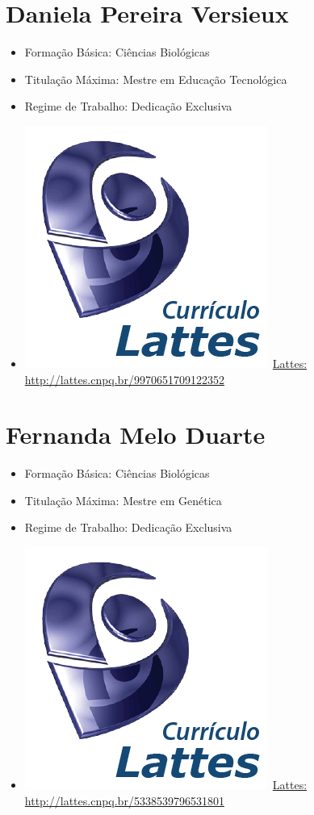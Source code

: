 \documentclass[11pt,fleqn]{book} %
\begin{document}
\section{Daniela Pereira Versieux}\label{DanielaVersieux}
\begin{itemize}
	\item Formação Básica: Ciências Biológicas
	\item Titulação Máxima: Mestre em Educação Tecnológica
	\item Regime de Trabalho: Dedicação Exclusiva
	\item \includegraphics[scale=.03]{Pictures/lattes}~\href{http://lattes.cnpq.br/9970651709122352}{Lattes: http://lattes.cnpq.br/9970651709122352}
\end{itemize}

\section{Fernanda Melo Duarte}\label{FernandaDuarte}
\begin{itemize}
	\item Formação Básica: Ciências Biológicas
	\item Titulação Máxima: Mestre em Genética
	\item Regime de Trabalho: Dedicação Exclusiva
	\item \includegraphics[scale=.03]{Pictures/lattes}~\href{http://lattes.cnpq.br/5338539796531801}{Lattes: http://lattes.cnpq.br/5338539796531801}
\end{itemize}
\end{document}
